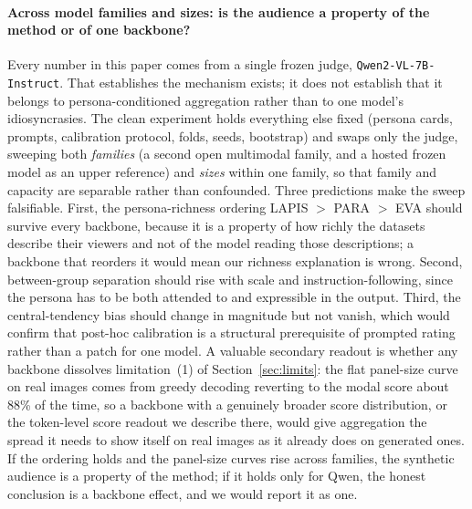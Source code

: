 \documentclass{article}
\begin{document}
\paragraph{Across model families and sizes: is the audience a property of the method or of one backbone?} Every number in this paper comes from a single frozen judge, \texttt{Qwen2-VL-7B-Instruct}. That establishes the mechanism exists; it does not establish that it belongs to persona-conditioned aggregation rather than to one model's idiosyncrasies. The clean experiment holds everything else fixed (persona cards, prompts, calibration protocol, folds, seeds, bootstrap) and swaps only the judge, sweeping both \emph{families} (a second open multimodal family, and a hosted frozen model as an upper reference) and \emph{sizes} within one family, so that family and capacity are separable rather than confounded. Three predictions make the sweep falsifiable. First, the persona-richness ordering LAPIS $>$ PARA $>$ EVA should survive every backbone, because it is a property of how richly the datasets describe their viewers and not of the model reading those descriptions; a backbone that reorders it would mean our richness explanation is wrong. Second, between-group separation should rise with scale and instruction-following, since the persona has to be both attended to and expressible in the output. Third, the central-tendency bias should change in magnitude but not vanish, which would confirm that post-hoc calibration is a structural prerequisite of prompted rating rather than a patch for one model. A valuable secondary readout is whether any backbone dissolves limitation~(1) of Section~\ref{sec:limits}: the flat panel-size curve on real images comes from greedy decoding reverting to the modal score about 88\% of the time, so a backbone with a genuinely broader score distribution, or the token-level score readout we describe there, would give aggregation the spread it needs to show itself on real images as it already does on generated ones. If the ordering holds and the panel-size curves rise across families, the synthetic audience is a property of the method; if it holds only for Qwen, the honest conclusion is a backbone effect, and we would report it as one.
\end{document}
